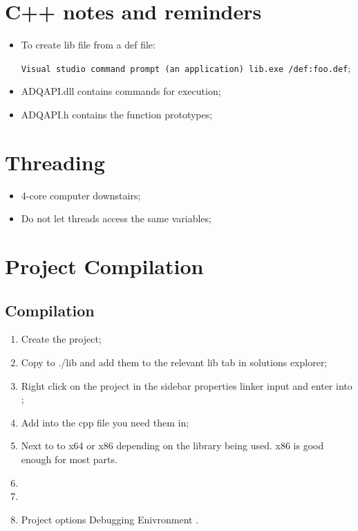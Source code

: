 \section{C++ notes and reminders}

 \begin{itemize}
 	\item To create lib file from a def file:
 	\begin{center}
 		\texttt{Visual studio command prompt (an application) \ra lib.exe /def:foo.def};
 	\end{center}
 	\item ADQAPI.dll contains commands for execution;
 	\item ADQAPI.h contains the function prototypes;
 \end{itemize}

\section{Threading}
 \begin{itemize}
 	\item 4-core computer downstairs;
 	\item Do not let threads access the same variables;
 \end{itemize}

\section{Project Compilation}
 \subsection{Compilation}
 \begin{enumerate}
 	\item Create the project;
 	\item Copy  to ./lib and add them to the relevant lib tab in solutions explorer;
 	\item Right click on the project in the sidebar \ra properties \ra linker \ra input and enter  into ;
 	\item Add  into the cpp file you need them in;
 	\item Next to  to x64 or x86 depending on the library being used. x86 is good enough for most parts.
 	\item {}
 	\item {}
 	\item {} Project options \ra Debugging \ra Enivronment \ra {}.
 \end{enumerate}
